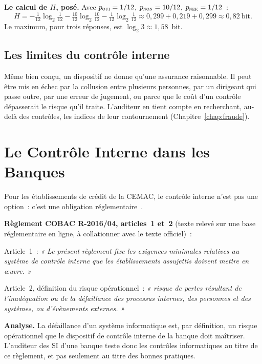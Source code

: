 \begin{boxinfo}
\textbf{Le calcul de $H$, posé.} Avec $p_{\textsc{oui}} = 1/12$,
$p_{\textsc{non}} = 10/12$, $p_{\textsc{nek}} = 1/12$~:
\[
H = -\tfrac{1}{12}\log_2\tfrac{1}{12} - \tfrac{10}{12}\log_2\tfrac{10}{12}
    - \tfrac{1}{12}\log_2\tfrac{1}{12}
  \approx 0{,}299 + 0{,}219 + 0{,}299 \approx 0{,}82~\text{bit.}
\]
Le maximum, pour trois réponses, est $\log_2 3 \approx 1{,}58$~bit.
\end{boxinfo}

\subsection{Les limites du contrôle interne}
\label{sec:c03-limites}

Même bien conçu, un dispositif ne donne qu'une assurance raisonnable. Il
peut être mis en échec par la collusion entre plusieurs personnes, par un
dirigeant qui passe outre, par une erreur de jugement, ou parce que le coût
d'un contrôle dépasserait le risque qu'il traite. L'auditeur en tient compte
en recherchant, au-delà des contrôles, les indices de leur contournement
(Chapitre~\ref{chap:fraude}).

\section{Le Contrôle Interne dans les Banques}
\label{sec:c03-cobac}

Pour les établissements de crédit de la CEMAC, le contrôle interne n'est
pas une option~: c'est une obligation réglementaire~\cite{cobac2016r04}.

\begin{boxjuris}
\textbf{Règlement COBAC R-2016/04, articles~1 et~2} (texte relevé sur une
base réglementaire en ligne, à collationner avec le texte officiel)~:

\medskip
Article~1~: \textit{« Le présent règlement fixe les exigences minimales
relatives au système de contrôle interne que les établissements assujettis
doivent mettre en œuvre. »}

\medskip
Article~2, définition du risque opérationnel~: \textit{« risque de pertes
résultant de l'inadéquation ou de la défaillance des processus internes,
des personnes et des systèmes, ou d'évènements externes. »}

\medskip
\textbf{Analyse.} La défaillance d'un système informatique est, par
définition, un risque opérationnel que le dispositif de contrôle interne de
la banque doit maîtriser. L'auditeur des SI d'une banque teste donc les
contrôles informatiques au titre de ce règlement, et pas seulement au titre
des bonnes pratiques.
\end{boxjuris}

